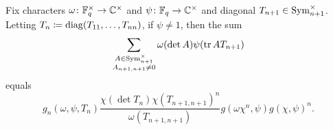 \begin{lemma} \label{lem:gsum-sym-ind-not-0}
    Fix characters $\omega\colon\mathbb F_q^\times\to\mathbb C^\times$ and $\psi\colon\mathbb F_q\to\mathbb C^\times$ and diagonal $T_{n+1}\in\operatorname{Sym}_{n+1}^\times$. Letting $T_n\coloneqq\operatorname{diag}(T_{11},\ldots,T_{nn})$, if $\psi\ne1$, then the sum
    \[\sum_{\substack{A\in\operatorname{Sym}_{n+1}^\times\\A_{n+1,n+1}\ne0}}\omega(\det A)\psi(\operatorname{tr} AT_{n+1})\]
    equals
    \[g_n(\omega,\psi,T_n)\frac{\chi(\det T_n)\chi(T_{n+1,n+1})^n}{\omega(T_{n+1,n+1})}g(\omega\chi^n,\psi)g(\chi,\psi)^n.
    \]
\end{lemma}
